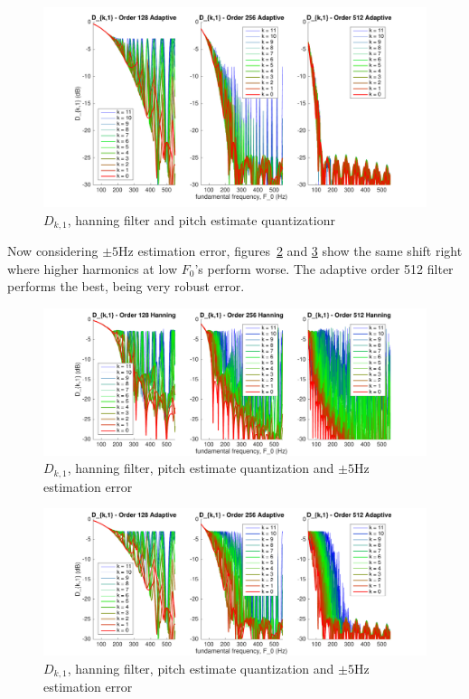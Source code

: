 \documentclass [11pt, proquest,oneside] {ganter_thesis}[2015/03/03]
\begin{document}
\begin{figure}[!ht]
  \centering
    \includegraphics[width=1\textwidth]{pitch_d_ki_2}
    \caption{$D_{k,1}$, hanning filter and pitch estimate quantizationr}\label{fig:pitch_d_ki_2}
\end{figure}

Now considering $\pm5$Hz estimation error, figures~\ref{fig:pitch_d_ki_1_error5} and \ref{fig:pitch_d_ki_2_error5} show the same shift right where higher harmonics at low $F_0$'s perform worse.  The adaptive order 512 filter performs the best, being very robust error.

\begin{figure}[!ht]
  \centering
    \includegraphics[width=1\textwidth]{pitch_d_ki_1_error5}
    \caption{$D_{k,1}$, hanning filter, pitch estimate quantization and $\pm5$Hz estimation error}\label{fig:pitch_d_ki_1_error5}
\end{figure}

\begin{figure}[!ht]
  \centering
    \includegraphics[width=1\textwidth]{pitch_d_ki_2_error5}
    \caption{$D_{k,1}$, hanning filter, pitch estimate quantization and $\pm5$Hz estimation error}\label{fig:pitch_d_ki_2_error5}
\end{figure}
\end{document}
